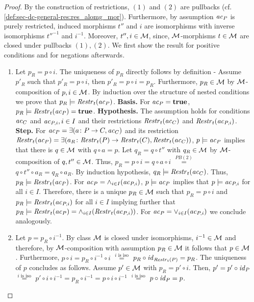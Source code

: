 \begin{proof}
By the construction of restrictions, $(1)$ and $(2)$ are pullbacks (cf. \cref{def:sec-dc-general-res:res_alomg_mor}).
Furthermore, by assumption $\mathit{ac}_P$ is purely restricted, induced morphisms $t''$ and $i$ are isomorphisms with inverse isomorphisms $t''^{-1}$ and $i^{-1}$.
Moreover, $t'',i \in {\cal M}$, since, ${\cal M}$-morphisms $t \in {\cal M}$ are closed under pullbacks $(1),(2)$.
We first show the result for positive conditions and for negations afterwards.
\begin{enumerate}
  \item Let $p_R=p \circ i$.
  The uniqueness of $p_R$ directly follows by definition - Assume $p'_R$ such that $p'_R=p \circ i$, then $p'_R=p \circ i=p_R$.
  Furthermore, $p_R \in {\cal M}$ by ${\cal M}$-composition of $p,i \in {\cal M}$.
  By induction over the structure of nested conditions we prove that $p_R \models \mathit{Restr}_t(\mathit{ac}_P)$.
  \textbf{Basis.}
  For $\mathit{ac}_P=\textbf{true}$, $p_R \models \mathit{Restr}_t(\mathit{ac}_P)=\textbf{true}$.
  \textbf{Hypothesis.}
  The assumption holds for conditions $\mathit{ac}_C$ and $\mathit{ac}_{P,i},i \in I$ and their restrictions $\mathit{Restr}_t(\mathit{ac}_C)$ and $\mathit{Restr}_t(\mathit{ac}_{P,i})$.
  \textbf{Step.}
  For $\mathit{ac}_P=\exists(a\colon P \to C, \mathit{ac}_C)$ and its restriction $\mathit{Restr}_t(\mathit{ac}_P)=\exists(a_R\colon \mathit{Restr}_t(P) \to \mathit{Restr}_t(C), \mathit{Restr}_t(\mathit{ac}_C))$, $p \models \mathit{ac}_P$ implies that there is $q \in {\cal M}$ with $q \circ a=p$.
  Let $q_R=q \circ t''$ with $q_R \in {\cal M}$ by ${\cal M}$-composition of $q,t'' \in {\cal M}$.
  Thus, $p_R=p \circ i=q \circ a \circ i$ $\stackrel{PB (2)}{=}$ $q \circ t'' \circ a_R=q_R \circ a_R$.
  By induction hypothesis, $q_R \models \mathit{Restr}_t(\mathit{ac}_C)$.
  Thus, $p_R \models \mathit{Restr}_t(\mathit{ac}_P)$.
  For $\mathit{ac}_P=\wedge_{i \in I}(\mathit{ac}_{P,i})$, $p \models \mathit{ac}_P$ implies that $p \models \mathit{ac}_{P,i}$ for all $i \in I$.
  Therefore, there is a unique $p_R \in {\cal M}$ such that $p_R=p \circ i$ and $p_R \models \mathit{Restr}_t(\mathit{ac}_{P,i})$ for all $i \in I$ implying further that $p_R \models \mathit{Restr}_t(\mathit{ac}_P)=\wedge_{i \in I}(\mathit{Restr}_t(\mathit{ac}_{P,i}))$.
  For $\mathit{ac}_P=\vee_{i \in I}(\mathit{ac}_{P,i})$ we conclude analogously.
  \item Let $p=p_R \circ i^{-1}$.
  By class ${\cal M}$ is closed under isomorphisms, $i^{-1} \in {\cal M}$ and therefore, by ${\cal M}$-composition with assumption $p_R \in {\cal M}$ it follows that $p \in {\cal M}$.
  Furthermore, $p \circ i=p_R \circ i^{-1} \circ i$ $\stackrel{i\text{ is iso}}{=}$ $p_R \circ \mathit{id}_{\mathit{Restr}_t(P)}=p_R$.
  The uniqueness of $p$ concludes as follows.
  Assume $p' \in {\cal M}$ with $p_R=p' \circ i$.
  Then, $p'=p' \circ \mathit{id}_P$ $\stackrel{i\text{ is iso}}{=}$ $p' \circ i \circ i^{-1}=p_R \circ i^{-1}=p \circ i \circ i^{-1}$ $\stackrel{i\text{ is iso}}{=}$ $p \circ \mathit{id}_P=p$.

\end{enumerate}
\end{proof}

